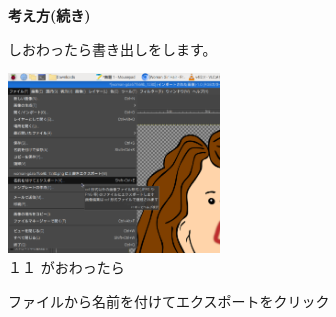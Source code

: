 \documentclass[a4paper,12pt]{jarticle}
\begin{document}
\clearpage
\begin{figure}
  \textbf{考え方(続き)}


  しおわったら書き出しをします。

  \centering
  \begin{minipage}{\textwidth}
    \includegraphics[width=0.5\textwidth]{textbook-img138.png}\\
    １１ がおわったら

    ファイルから名前を付けてエクスポートをクリック
  \end{minipage}

  \bigskip



\end{figure}
\end{document}
